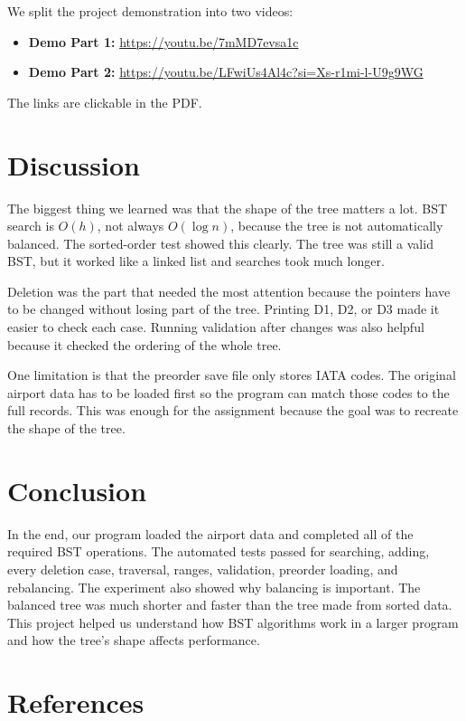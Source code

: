 \documentclass[12pt]{article}
\begin{document}
We split the project demonstration into two videos:

\begin{itemize}
    \item \textbf{Demo Part 1:} \url{https://youtu.be/7mMD7evsa1c}
    \item \textbf{Demo Part 2:} \url{https://youtu.be/LFwiUs4Al4c?si=Xs-r1mi-l-U9g9WG}
\end{itemize}

The links are clickable in the PDF.

\section{Discussion}

The biggest thing we learned was that the shape of the tree matters a lot. BST search is $O(h)$, not always $O(\log n)$, because the tree is not automatically balanced. The sorted-order test showed this clearly. The tree was still a valid BST, but it worked like a linked list and searches took much longer.

Deletion was the part that needed the most attention because the pointers have to be changed without losing part of the tree. Printing D1, D2, or D3 made it easier to check each case. Running validation after changes was also helpful because it checked the ordering of the whole tree.

One limitation is that the preorder save file only stores IATA codes. The original airport data has to be loaded first so the program can match those codes to the full records. This was enough for the assignment because the goal was to recreate the shape of the tree.

\section{Conclusion}

In the end, our program loaded the airport data and completed all of the required BST operations. The automated tests passed for searching, adding, every deletion case, traversal, ranges, validation, preorder loading, and rebalancing. The experiment also showed why balancing is important. The balanced tree was much shorter and faster than the tree made from sorted data. This project helped us understand how BST algorithms work in a larger program and how the tree's shape affects performance.

\section{References}
\end{document}
